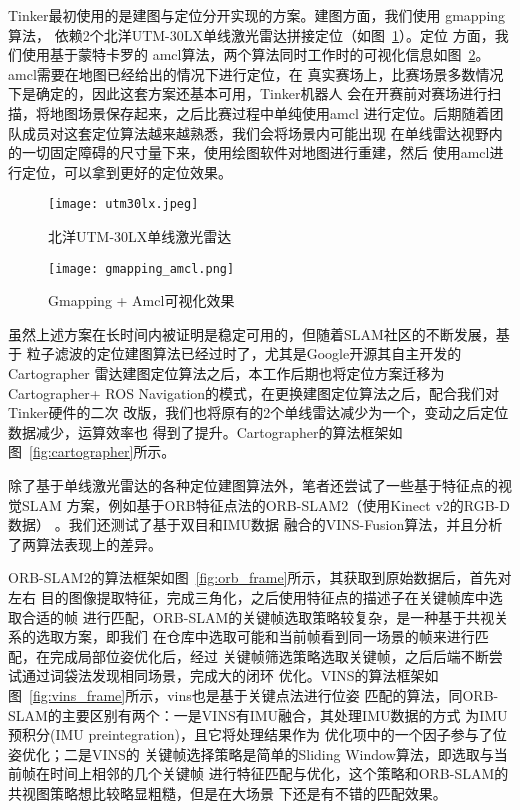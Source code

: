 Tinker最初使用的是建图与定位分开实现的方案。建图方面，我们使用
gmapping算法\cite{grisettiyz2005improving}，
依赖2个北洋UTM-30LX单线激光雷达拼接定位（如图~\ref{fig:utm30lx}）。定位
方面，我们使用基于蒙特卡罗的
amcl算法\cite{fox2002kld}，两个算法同时工作时的可视化信息如图~\ref{fig:gmapping_amcl}。
amcl需要在地图已经给出的情况下进行定位，在
真实赛场上，比赛场景多数情况下是确定的，因此这套方案还基本可用，Tinker机器人
会在开赛前对赛场进行扫描，将地图场景保存起来，之后比赛过程中单纯使用amcl
进行定位。后期随着团队成员对这套定位算法越来越熟悉，我们会将场景内可能出现
在单线雷达视野内的一切固定障碍的尺寸量下来，使用绘图软件对地图进行重建，然后
使用amcl进行定位，可以拿到更好的定位效果。

\begin{figure}
  \centering
  \texttt{[image: utm30lx.jpeg]}
  \caption{北洋UTM-30LX单线激光雷达}
  \label{fig:utm30lx}
\end{figure}


\begin{figure}
  \centering
  \texttt{[image: gmapping\_amcl.png]}
  \caption{Gmapping + Amcl可视化效果}
  \label{fig:gmapping_amcl}
\end{figure}

虽然上述方案在长时间内被证明是稳定可用的，但随着SLAM社区的不断发展，基于
粒子滤波的定位建图算法已经过时了，尤其是Google开源其自主开发的Cartographer
雷达建图定位算法\cite{hess2016real}之后，本工作后期也将定位方案迁移为Cartographer+
ROS Navigation的模式，在更换建图定位算法之后，配合我们对Tinker硬件的二次
改版，我们也将原有的2个单线雷达减少为一个，变动之后定位数据减少，运算效率也
得到了提升。Cartographer的算法框架如图~\ref{fig:cartographer}所示。


除了基于单线激光雷达的各种定位建图算法外，笔者还尝试了一些基于特征点的视觉SLAM
方案，例如基于ORB特征点法的ORB-SLAM2（使用Kinect v2的RGB-D数据）\cite{mur2015orb}
。我们还测试了基于双目和IMU数据
融合的VINS-Fusion\cite{qin2018vins}算法，并且分析了两算法表现上的差异。

ORB-SLAM2的算法框架如图~\ref{fig:orb_frame}所示，其获取到原始数据后，首先对左右
目的图像提取特征，完成三角化，之后使用特征点的描述子在关键帧库中选取合适的帧
进行匹配，ORB-SLAM的关键帧选取策略较复杂，是一种基于共视关系的选取方案，即我们
在仓库中选取可能和当前帧看到同一场景的帧来进行匹配，在完成局部位姿优化后，经过
关键帧筛选策略选取关键帧，之后后端不断尝试通过词袋法发现相同场景，完成大的闭环
优化。VINS的算法框架如图~\ref{fig:vins_frame}所示，vins也是基于关键点法进行位姿
匹配的算法，同ORB-SLAM的主要区别有两个：一是VINS有IMU融合，其处理IMU数据的方式
为IMU预积分(IMU preintegration)\cite{forster2015manifold}，且它将处理结果作为
优化项中的一个因子参与了位姿优化；二是VINS的
关键帧选择策略是简单的Sliding Window算法，即选取与当前帧在时间上相邻的几个关键帧
进行特征匹配与优化，这个策略和ORB-SLAM的共视图策略想比较略显粗糙，但是在大场景
下还是有不错的匹配效果。




